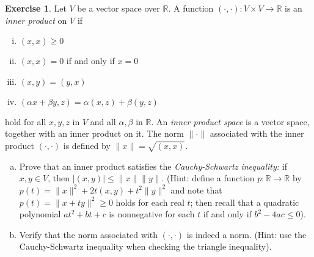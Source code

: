 \documentclass[11pt,a4paper,twoside]{article}
\theoremstyle{definition}
\newcounter{excounter}
\newtheorem{exercise}[excounter]{Exercise}
\begin{document}
\begin{exercise}

  Let $V$ be a vector space over $\mathbb{R}$. A function $(\cdot, \cdot): V \times V \to \mathbb{R}$ is an \emph{inner product} on $V$ if
  \begin{enumerate}[(i)]
  \item $(x, x) \geq 0$
  \item $(x, x) = 0$ if and only if $x = 0$
  \item $(x, y) = (y, x)$
  \item $(\alpha x + \beta y, z) = \alpha (x, z) + \beta (y, z)$
  \end{enumerate}
  hold for all $x, y, z$ in $V$ and all $\alpha, \beta$ in $\mathbb{R}$. An \emph{inner product space} is a vector space, together with an inner product on it.
  The norm $\| \cdot \|$ associated with the inner product $(\cdot, \cdot)$ is defined by $\| x \| = \sqrt{(x, x)}$.
  \begin{enumerate}[(a)]
  \item Prove that an inner product satisfies the \emph{Cauchy-Schwartz inequality:} if $x, y \in V$, then $|(x, y)| \leq \| x \| \| y \|$.
    (Hint: define a function $p : \mathbb{R} \to \mathbb{R}$ by $p (t) = \| x \|^2 + 2 t (x, y) + t^2 \| y \|^2$ and note that $p (t) = \| x + t y \|^2 \geq 0$ holds
    for each real $t$; then recall that a quadratic polynomial $a t^2 + bt + c$ is nonnegative for each $t$ if and only if $b^2 - 4 a c \leq 0$).
  \item Verify that the norm associated with $(\cdot, \cdot)$ is indeed a norm. (Hint: use the Cauchy-Schwartz inequality when checking the triangle inequality).
  \end{enumerate}

\end{exercise}
\end{document}
